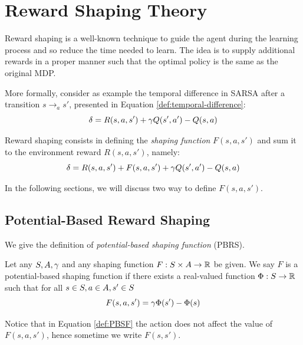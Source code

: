 \section{Reward Shaping Theory}
Reward shaping is a well-known technique to guide the agent during the learning process and so reduce the time needed to learn. The idea is to supply additional rewards in a proper manner such that the optimal policy is the same as the original MDP.

More formally, consider as example the temporal difference in SARSA after a transition $s \to_a s'$, presented in Equation \ref{def:temporal-difference}:
\begin{equation}
\delta = R(s,a,s') + \gamma Q(s', a') - Q(s, a)
\end{equation}

Reward shaping consists in defining the \emph{shaping function} $F(s,a,s')$ and sum it to the environment reward $R(s,a,s')$, namely:
\begin{equation}\label{eq:temporal-difference-reward-shaping}
\delta = R(s,a,s') + F(s,a,s') + \gamma Q(s', a') - Q(s, a)
\end{equation}

In the following sections, we will discuss two way to define $F(s,a,s')$. 

\subsection{Potential-Based Reward Shaping}\label{sect:PBRS}
We give the definition of \emph{potential-based shaping function} (PBRS).
\begin{definition}\label{def:PBSF}
	Let any $S, A, \gamma$ and any shaping function $F: S\times A\to\mathbb{R}$ be given.
	We say $F$ is a potential-based shaping function if there exists a real-valued function $\Phi: S \to \mathbb{R}$ such that for all $s\in S, a\in A, s'\in S$
	\begin{equation}\label{eq:PBSF}
	F(s,a,s') = \gamma\Phi(s') - \Phi(s)
	\end{equation}
\end{definition}
Notice that in Equation \ref{def:PBSF} the action does not affect the value of $F(s,a,s')$, hence sometime we write $F(s,s')$.

